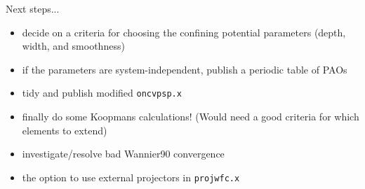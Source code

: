 \documentclass[xcolor=table,aspectratio=169]{beamer}
\numberwithin{equation}{section}
\begin{document}
\begin{frame}{Next steps...}
   \begin{itemize}[<+(1)->]
      \item decide on a criteria for choosing the confining potential parameters (depth, width, and smoothness)
      \item if the parameters are system-independent, publish a periodic table of PAOs
      \item tidy and publish modified \texttt{oncvpsp.x}
      \item finally do some Koopmans calculations! (Would need a good criteria for which elements to extend)
   \end{itemize}

   \begin{itemize}[<+(2)->]
      \item investigate/resolve bad Wannier90 convergence
      \item the option to use external projectors in \texttt{projwfc.x}
   \end{itemize}
   
\end{frame}
\end{document}
